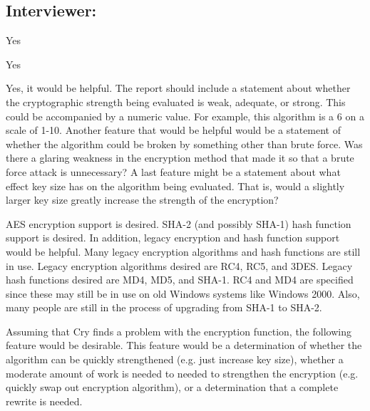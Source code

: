 \subsection{Interviewer: \dd}


\begin{answer}{1}
Yes
\end{answer}


\begin{answer}{2}
Yes
\end{answer}


\begin{answer}{3}
Yes, it would be helpful.
   The report should include a statement about whether the cryptographic strength being evaluated is weak, adequate, or strong. This could be accompanied by a numeric value. For example, this algorithm is a 6 on a scale of 1-10.
   Another feature that would be helpful would be a statement of whether the algorithm could be broken by something other than brute force. Was there a glaring weakness in the encryption method that made it so that a brute force attack is unnecessary?
   A last feature might be a statement about what effect key size has on the algorithm being evaluated. That is, would a slightly larger key size greatly increase the strength of the encryption?
\end{answer}


\begin{answer}{4}
AES encryption support is desired. SHA-2 (and possibly SHA-1) hash function support is desired. In addition, legacy encryption and hash function support would be helpful. Many legacy encryption algorithms and hash functions are still in use. Legacy encryption algorithms desired are RC4, RC5, and 3DES. Legacy hash functions desired are MD4, MD5, and SHA-1. RC4 and MD4 are specified since these may still be in use on old Windows systems like Windows 2000. Also, many people are still in the process of upgrading from SHA-1 to SHA-2.
\end{answer}


\begin{answer}{5}
Assuming that Cry finds a problem with the encryption function, the following feature would be desirable. This feature would be a determination of whether the algorithm can be quickly strengthened (e.g. just increase key size), whether a moderate amount of work is needed to needed to strengthen the encryption (e.g. quickly swap out encryption algorithm), or a determination that a complete rewrite is needed.
\end{answer}


